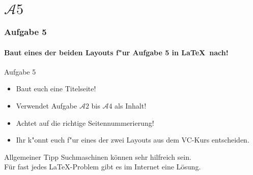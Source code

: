 \section{$\mathcal{A}5$}

\begin{frame}
\frametitle{Aufgabe 5}
\framesubtitle{Baut eines der beiden Layouts f"ur Aufgabe 5 in \LaTeX ~nach!}

\begin{block}{Aufgabe 5}
\begin{itemize}
\item Baut euch eine Titelseite!%
\item Verwendet Aufgabe $\mathcal{A}2$ bis $\mathcal{A}4$ als Inhalt!%
\item Achtet auf die richtige Seitennummerierung!%
\item Ihr k"onnt euch f"ur eines der zwei Layouts aus dem VC-Kurs entscheiden.%
\end{itemize}
\end{block}

\begin{exampleblock}{Allgemeiner Tipp}
Suchmaschinen können sehr hilfreich sein. \\ Für fast jedes \LaTeX-Problem gibt es im Internet eine Lösung.
\end{exampleblock}

\end{frame}
